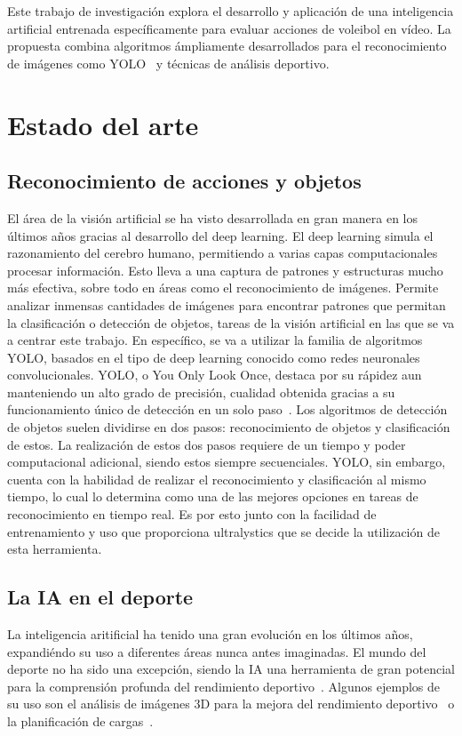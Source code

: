 \documentclass[12pt]{report} %
\begin{document}
    Este trabajo de investigación explora el desarrollo y aplicación de una
    inteligencia artificial entrenada específicamente para evaluar acciones de
    voleibol en vídeo. La propuesta combina algoritmos ámpliamente
    desarrollados para el reconocimiento de imágenes como YOLO~\cite{YOLO} y
    técnicas de análisis deportivo.

 

    \chapter{Estado del arte}
    \label{chap:estadoarte}

    \section{Reconocimiento de acciones y objetos}
    El área de la visión artificial se ha visto desarrollada en gran manera en
    los últimos años gracias al desarrollo del deep learning. El deep learning
    simula el razonamiento del cerebro humano, permitiendo a varias capas
    computacionales procesar información. Esto lleva a una captura de patrones
    y estructuras mucho más efectiva, sobre todo en áreas como el
    reconocimiento de imágenes. Permite analizar inmensas cantidades de
    imágenes para encontrar patrones que permitan la clasificación o detección
    de objetos, tareas de la visión artificial en las que se va a centrar este
    trabajo.  En específico, se va a utilizar la familia de algoritmos YOLO,
    basados en el tipo de deep learning conocido como redes neuronales
    convolucionales. YOLO, o You Only Look Once, destaca por su rápidez aun
    manteniendo un alto grado de precisión, cualidad obtenida gracias a su
    funcionamiento único de detección en un solo paso~\cite{JIANG20221066}. Los algoritmos de
    detección de objetos suelen dividirse en dos pasos: reconocimiento de
    objetos y clasificación de estos. La realización de estos dos pasos
    requiere de un tiempo y poder computacional adicional, siendo estos siempre
    secuenciales. YOLO, sin embargo, cuenta con la habilidad de realizar el
    reconocimiento y clasificación al mismo tiempo, lo cual lo determina como
    una de las mejores opciones en tareas de reconocimiento en tiempo real. Es
    por esto junto con la facilidad de entrenamiento y uso que proporciona
    ultralystics que se decide la utilización de esta herramienta.

    \section{La IA en el deporte}
    La inteligencia aritificial ha tenido una gran evolución en los últimos
    años, expandiéndo su uso a diferentes áreas nunca antes imaginadas. El
    mundo del deporte no ha sido una excepción, siendo la IA una herramienta de
    gran potencial para la comprensión profunda del rendimiento
    deportivo~\cite{ia-sport}. Algunos ejemplos de su uso son el análisis de
    imágenes 3D para la mejora del rendimiento deportivo~\cite{analysis3d} o la
    planificación de cargas~\cite{wl}. 
\end{document}
